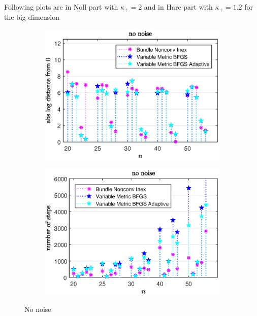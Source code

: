Following plots are in Noll part with \(\kappa_+ = 2\) and in Hare part with \(\kappa_+ = 1.2\) for the big dimension
\begin{figure}[H]%
	\begin{subfigure}{0.49\textwidth}
		\includegraphics[width=\textwidth]{Pictures/Plots/no_noise_b.eps}%
	\end{subfigure}
	\begin{subfigure}{0.49\textwidth}
		\includegraphics[width=\textwidth]{Pictures/Plots/steps_no_noise_b.eps}%
	\end{subfigure}
	\label{fig_no_noise_large}
	\caption{No noise}
\end{figure}

